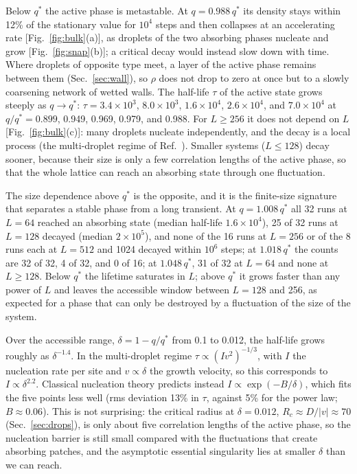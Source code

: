 \documentclass[pre,twocolumn,superscriptaddress,showpacs,floatfix]{revtex4-2}
\newcommand{\qs}{q^{*}}
\begin{document}
Below $\qs$ the active phase is metastable. At $q = 0.988\,\qs$ its density stays within 12\% of
the stationary value for $10^4$ steps and then collapses at an accelerating rate
[Fig.~\ref{fig:bulk}(a)], as droplets of the two absorbing phases nucleate and grow
[Fig.~\ref{fig:snap}(b)]; a critical decay would instead slow down with time. Where droplets of opposite type meet, a layer of the active phase
remains between them (Sec.~\ref{sec:wall}), so $\rho$ does not drop to zero at once but to a slowly
coarsening network of wetted walls. The half-life $\tau$ of the active state grows steeply as
$q\to\qs$: $\tau = 3.4\times10^3$, $8.0\times10^3$, $1.6\times10^4$, $2.6\times10^4$, and
$7.0\times10^4$ at $q/\qs = 0.899$, 0.949, 0.969, 0.979, and 0.988. For $L\ge 256$ it does not depend
on $L$ [Fig.~\ref{fig:bulk}(c)]: many droplets nucleate independently, and the decay is a local
process (the multi-droplet regime of Ref.~\cite{rikvold1994}). Smaller systems ($L\le 128$) decay
sooner, because their size is only a few correlation lengths of the active phase, so that
the whole lattice can reach an absorbing state through one fluctuation.

The size dependence above $\qs$ is the opposite, and it is the finite-size signature that
separates a stable phase from a long transient. At $q = 1.008\,\qs$ all 32 runs at $L = 64$
reached an absorbing state (median half-life $1.6\times10^4$), 25 of 32 runs at $L = 128$ decayed
(median $2\times10^5$), and none of the 16 runs at $L = 256$ or of the 8 runs each at $L = 512$
and 1024 decayed within $10^6$ steps; at $1.018\,\qs$ the counts are 32 of 32, 4 of 32, and 0 of
16; at $1.048\,\qs$, 31 of 32 at $L = 64$ and none at $L\ge 128$. Below $\qs$ the lifetime
saturates in $L$; above $\qs$ it grows faster than any power of $L$ and leaves the accessible
window between $L = 128$ and 256, as expected for a phase that can only be destroyed by a
fluctuation of the size of the system.

Over the accessible range, $\delta = 1-q/\qs$ from 0.1 to 0.012, the half-life grows roughly as
$\delta^{-1.4}$. In the multi-droplet regime $\tau\propto(Iv^2)^{-1/3}$, with $I$ the nucleation
rate per site and $v\propto\delta$ the growth velocity, so this corresponds to $I\propto\delta^{2.2}$.
Classical nucleation theory predicts instead $I\propto\exp(-B/\delta)$, which fits the five points
less well (rms deviation 13\% in $\tau$, against 5\% for the power law; $B\approx 0.06$). This is not
surprising: the critical radius at $\delta = 0.012$, $R_c\approx D/|v|\approx 70$
(Sec.~\ref{sec:drops}), is only about five correlation lengths of the active phase, so the
nucleation barrier is still small compared with the fluctuations that create absorbing patches,
and the asymptotic essential singularity lies at smaller $\delta$ than we can reach.
\end{document}
